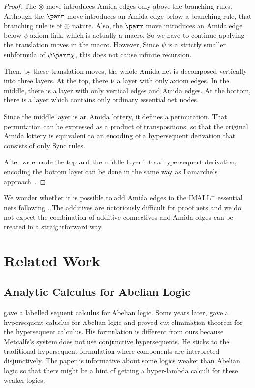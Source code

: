 \begin{proof}
The $\otimes$ move introduces Amida edges only above the branching rules.
Although the $\parr$ move introduces an Amida edge below a
branching rule, that branching rule is of $\otimes$ nature.
Also, the $\parr$ move introduces an Amida edge below $\psi$-axiom link,
which is actually a macro.  So we have to continue applying the
translation moves in the macro.  However, Since $\psi$ is a strictly
smaller subformula of $\psi\parr\chi$, this does not cause infinite
recursion.

Then, by these translation moves,
the whole Amida net is decomposed vertically into three layers.
At the top, there is a layer with only axiom edges.
In the middle, there is a layer with only vertical edges and Amida
edges.
At the bottom, there is a layer which contains only ordinary
essential net nodes.

Since the middle layer is an Amida lottery, it defines a permutation.
That permutation can be expressed as a product of transpositions, so
that
the original Amida lottery is equivalent to an encoding of a
  hypersequent derivation
that consists of only Sync rules.

After we encode the top and the middle layer into a hypersequent
derivation, encoding the bottom layer
can be done in the same way as Lamarche's approach~\citep{lamarche2008}.
\end{proof}

We wonder whether it is possible to add Amida edges to
the IMALL$^-$ essential nets following
\citet{lamarche2008}.
The additives are notoriously difficult for proof nets and we do not
expect the combination of additive connectives and Amida edges can be
treated in a straightforward way.

\section{Related Work}

\subsection{Analytic Calculus for Abelian Logic}

\citet{metcalfe2002} gave a labelled sequent calculus for Abelian logic.
Some years later,
\citet{metcalfe2006} gave a hypersequent caluclus for Abelian logic and
proved cut-elimination theorem for the hypersequent calculus.
His formulation is different from ours because Metcalfe's system does
not use conjunctive hypersequents.  He sticks to the traditional
hypersequent formulation where components are interpreted disjunctively.
The paper \citep{metcalfe2006} is informative about some logics weaker
than Abelian logic so that there might be a hint of getting a
hyper-lambda calculi for these weaker logics.

